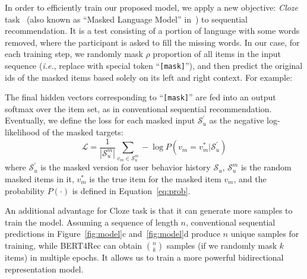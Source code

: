 In order to efficiently train our proposed model, we apply a new objective: \textit{Cloze} task~\cite{Wilson:Cloze} (also known as ``Masked Language Model'' in~\cite{Devlin:2018:BERT}) to sequential recommendation.
It is a test consisting of a portion of language with some words removed, where the participant is asked to fill the missing words.
In our case, for each training step, we randomly mask $\rho$ proportion of all items in the input sequence (\textit{i.e.}, replace with special token ``\texttt{[mask]}''), and then predict the original ids of the masked items based solely on its left and right context.
For example: 
\begin{figure}[h]
\centering
{}
\end{figure}

\noindent The final hidden vectors corresponding to ``\texttt{[mask]}'' are fed into an output softmax over the item set, as in conventional sequential recommendation.
Eventually, we define the loss for each masked input $\mathcal{S}_u^{\prime}$ as the negative log-likelihood of the masked targets: %
\begin{equation}
    \mathcal{L} = \frac{1}{|\mathcal{S}_u^m|} \sum_{v_m\in \mathcal{S}_u^m} -\log P(v_m=v_m^{*}|\mathcal{S}_u^{\prime} )
    \label{eq:loss}
\end{equation}
where $\mathcal{S}_u^{\prime}$ is the masked version for user behavior history $\mathcal{S}_u$, $\mathcal{S}_u^m$ is the random masked items in it, $v_m^*$ is the true item for the masked item $v_m$, and the probability $P(\cdot)$ is defined in Equation~\ref{eq:prob}.

An additional advantage for Cloze task is that it can generate more samples to train the model.
Assuming a sequence of length $n$, conventional sequential predictions in Figure~\ref{fig:model}c and~\ref{fig:model}d  produce $n$ unique samples for training, while BERT4Rec can obtain $\binom{n}{k}$ samples (if we randomly mask $k$ items) in multiple epochs.
It allows us to train a more powerful bidirectional representation model.




